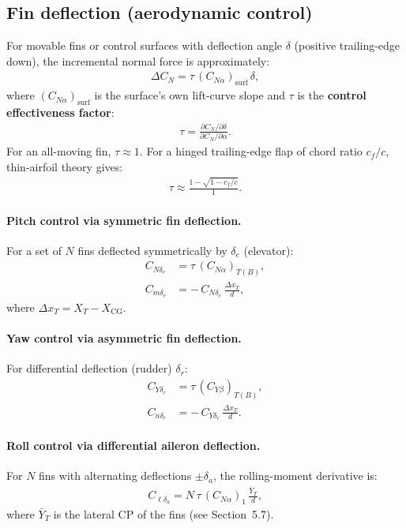 \documentclass[11pt]{article}
\begin{document}
\subsection{Fin deflection (aerodynamic control)}
For movable fins or control surfaces with deflection angle $\delta$ (positive trailing-edge down), the incremental normal force is approximately:
\begin{align}
\Delta C_N = \tau\,(C_{N\alpha})_{\text{surf}}\,\delta,
\end{align}
where $(C_{N\alpha})_{\text{surf}}$ is the surface's own lift-curve slope and $\tau$ is the \textbf{control effectiveness factor}:
\begin{align}
\tau = \frac{\partial C_N/\partial\delta}{\partial C_N/\partial\alpha}.
\end{align}
For an all-moving fin, $\tau\approx 1$. For a hinged trailing-edge flap of chord ratio $c_f/c$, thin-airfoil theory gives:
\begin{align}
\tau \approx \frac{1-\sqrt{1-c_f/c}}{1}.
\end{align}

\paragraph{Pitch control via symmetric fin deflection.}
For a set of $N$ fins deflected symmetrically by $\delta_e$ (elevator):
\begin{align}
\label{eq:CNdelta}
C_{N\delta_e} &= \tau\,(C_{N\alpha})_{T(B)},\\
C_{m\delta_e} &= -\,C_{N\delta_e}\,\frac{\Delta x_T}{d},
\end{align}
where $\Delta x_T = X_T-X_{\text{CG}}$.

\paragraph{Yaw control via asymmetric fin deflection.}
For differential deflection (rudder) $\delta_r$:
\begin{align}
\label{eq:CYdelta}
C_{Y\delta_r} &= \tau\,(C_{Y\beta})_{T(B)},\\
C_{n\delta_r} &= -\,C_{Y\delta_r}\,\frac{\Delta x_T}{d}.
\end{align}

\paragraph{Roll control via differential aileron deflection.}
For $N$ fins with alternating deflections $\pm\delta_a$, the rolling-moment derivative is:
\begin{align}
\label{eq:Cldelta}
C_{\ell\delta_a} = N\,\tau\,(C_{N\alpha})_1\,\frac{\bar Y_T}{d},
\end{align}
where $\bar Y_T$ is the lateral CP of the fins (see Section~5.7).
\end{document}
